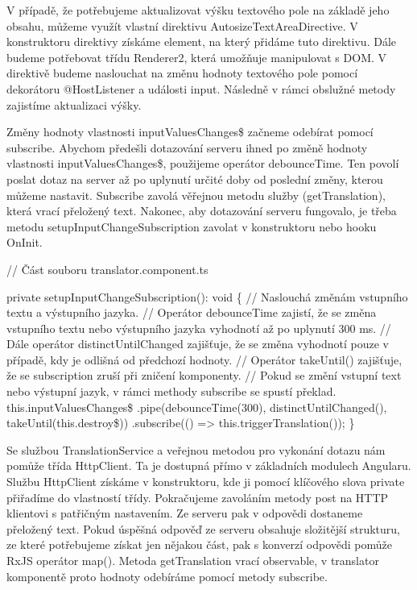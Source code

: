 V případě, že potřebujeme aktualizovat výšku textového pole na základě jeho obsahu, můžeme využít vlastní direktivu AutosizeTextAreaDirective. 
V konstruktoru direktivy získáme element, na který přidáme tuto direktivu. Dále budeme potřebovat třídu Renderer2, která umožňuje manipulovat s DOM. 
V direktivě budeme naslouchat na změnu hodnoty textového pole pomocí dekorátoru @HostListener a události input. Následně v rámci obslužné metody zajistíme aktualizaci výšky.
 
Změny hodnoty vlastnosti inputValuesChanges\$ začneme odebírat pomocí subscribe. 
Abychom předešli dotazování serveru ihned po změně hodnoty vlastnosti inputValuesChanges\$, použijeme operátor debounceTime. 
Ten povolí poslat dotaz na server až po uplynutí určité doby od poslední změny, kterou můžeme nastavit. 
Subscribe zavolá věřejnou metodu služby (getTranslation), která vrací přeložený text. 
Nakonec, aby dotazování serveru fungovalo, je třeba metodu setupInputChangeSubscription zavolat v konstruktoru nebo hooku OnInit.

\begin{prog}
// Část souboru translator.component.ts

private setupInputChangeSubscription(): void \{
  // Naslouchá změnám vstupního textu a výstupního jazyka.
  // Operátor debounceTime zajistí, že se změna vstupního textu 
    nebo výstupního jazyka vyhodnotí až po uplynutí 300 ms.
  // Dále operátor distinctUntilChanged zajišťuje, 
    že se změna vyhodnotí pouze v případě, kdy je odlišná od předchozí hodnoty.
  // Operátor takeUntil() zajišťuje, 
    že se subscription zruší při zničení komponenty.
  // Pokud se změní vstupní text nebo výstupní jazyk, 
    v rámci methody subscribe se spustí překlad.
  this.inputValuesChanges\$
    .pipe(debounceTime(300), distinctUntilChanged(), takeUntil(this.destroy\$))
    .subscribe(() => this.triggerTranslation());
\}
\end{prog}

Se službou TranslationService a veřejnou metodou pro vykonání dotazu nám pomůže třída HttpClient. Ta je dostupná přímo v základních modulech Angularu.
Službu HttpClient získáme v konstruktoru, kde ji pomocí klíčového slova private přiřadíme do vlastností třídy. 
Pokračujeme zavoláním metody post na HTTP klientovi s patřičným nastavením. Ze serveru pak v odpovědi dostaneme přeložený text. 
Pokud úspěšná odpověď ze serveru obsahuje složitější strukturu, ze které potřebujeme získat jen nějakou část, pak s konverzí odpovědi pomůže RxJS operátor map(). 
Metoda getTranslation vrací observable, v translator komponentě proto hodnoty odebíráme pomocí metody subscribe.

